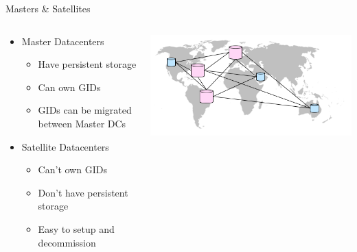 \documentclass[aspectratio=169]{beamer}
\begin{document}
\begin{frame}{Masters \& Satellites}
    \begin{columns}
        \begin{column}[c]{0.6\textwidth}
            \begin{itemize}
                \item Master Datacenters
                    \begin{itemize}
                        \item Have persistent storage
                        \item Can own GIDs
                        \item GIDs can be migrated between Master DCs
                    \end{itemize}
                \item Satellite Datacenters
                    \begin{itemize}
                        \item Can't own GIDs
                        \item Don't have persistent storage
                        \item Easy to setup and decommission
                    \end{itemize}
            \end{itemize}
        \end{column}
        \begin{column}[c]{0.4\textwidth}
            \includegraphics[width=\textwidth]{images/worldmapdc.png}
        \end{column}
    \end{columns}
\end{frame}

\end{document}
